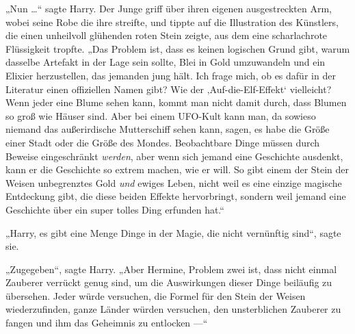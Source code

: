 „Nun …“ sagte Harry. Der Junge griff über ihren eigenen ausgestreckten Arm, wobei seine Robe die ihre streifte, und tippte auf die Illustration des Künstlers, die einen unheilvoll glühenden roten Stein zeigte, aus dem eine scharlachrote Flüssigkeit tropfte.
„Das Problem ist, dass es keinen logischen Grund gibt, warum dasselbe Artefakt in der Lage sein sollte, Blei in Gold umzuwandeln und ein Elixier herzustellen, das jemanden jung hält. Ich frage mich, ob es dafür in der Literatur einen offiziellen Namen gibt? Wie der ‚Auf-die-Elf-Effekt‘ vielleicht? Wenn jeder eine Blume sehen kann, kommt man nicht damit durch, dass Blumen so groß wie Häuser sind. Aber bei einem UFO-Kult kann man, da sowieso niemand das außerirdische Mutterschiff sehen kann, sagen, es habe die Größe einer Stadt oder die Größe des Mondes. Beobachtbare Dinge müssen durch Beweise eingeschränkt \emph{werden}, aber wenn sich jemand eine Geschichte ausdenkt, kann er die Geschichte so extrem machen, wie er will. So gibt einem der Stein der Weisen unbegrenztes Gold \emph{und} ewiges Leben, nicht weil es eine einzige magische Entdeckung gibt, die diese beiden Effekte hervorbringt, sondern weil jemand eine Geschichte über ein super tolles Ding erfunden hat.“

„Harry, es gibt eine Menge Dinge in der Magie, die nicht vernünftig sind“, sagte sie.

„Zugegeben“, sagte Harry.
„Aber Hermine, Problem zwei ist, dass nicht einmal Zauberer verrückt genug sind, um die Auswirkungen dieser Dinge beiläufig zu übersehen. Jeder würde versuchen, die Formel für den Stein der Weisen wiederzufinden, ganze Länder würden versuchen, den unsterblichen Zauberer zu fangen und ihm das Geheimnis zu entlocken —“

